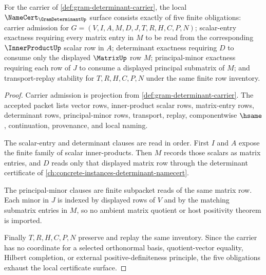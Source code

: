 \begin{theorem}
\label{thm:gram-determinant-namecert-obligations}
For the carrier of \autoref{def:gram-determinant-carrier}, the local $\NameCert_{\GramDeterminantUp}$ surface consists exactly of five finite obligations: carrier admission for $G=(V,I,A,M,D,J,T,R,H,C,P,N)$; scalar-entry exactness requiring every matrix entry in $M$ to be read from the corresponding $\InnerProductUp$ scalar row in $A$; determinant exactness requiring $D$ to consume only the displayed $\MatrixUp$ row $M$; principal-minor exactness requiring each row of $J$ to consume a displayed principal submatrix of $M$; and transport-replay stability for $T,R,H,C,P,N$ under the same finite row inventory.
\end{theorem}
\begin{proof}
Carrier admission is projection from \autoref{def:gram-determinant-carrier}. The accepted packet lists vector rows, inner-product scalar rows, matrix-entry rows, determinant rows, principal-minor rows, transport, replay, componentwise $\hsame$, continuation, provenance, and local naming.

The scalar-entry and determinant clauses are read in order. First $I$ and $A$ expose the finite family of scalar inner-products. Then $M$ records those scalars as matrix entries, and $D$ reads only that displayed matrix row through the determinant certificate of \autoref{ch:concrete-instances-determinant-namecert}.

The principal-minor clauses are finite subpacket reads of the same matrix row. Each minor in $J$ is indexed by displayed rows of $V$ and by the matching submatrix entries in $M$, so no ambient matrix quotient or host positivity theorem is imported.

Finally $T,R,H,C,P,N$ preserve and replay the same inventory. Since the carrier has no coordinate for a selected orthonormal basis, quotient-vector equality, Hilbert completion, or external positive-definiteness principle, the five obligations exhaust the local certificate surface.
\end{proof}


